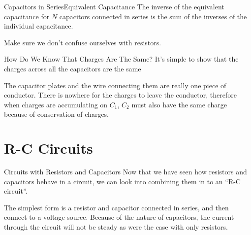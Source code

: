 \documentclass[12pt,aspectratio=169]{beamer}
\newcommand{\eq}[2]{\vspace{#1}{\Large\begin{displaymath}#2\end{displaymath}}}
\begin{document}
\begin{frame}{Capacitors in Series}{Equivalent Capacitance}
  The inverse of the equivalent capacitance for $N$ capacitors connected in
  series is the sum of the inverses of the individual capacitance.

  \eq{-.2in}{
    \boxed{ \frac1{C_s}=\sum_i\frac1{C_i} }
  }
  
  Make sure we don't confuse ourselves with resistors.
\end{frame}



\begin{frame}{How Do We Know That Charges Are The Same?}
  It's simple to show that the charges across all the capacitors are the same
  \begin{center}
  \end{center}
  The capacitor plates and the wire connecting them are really one piece of
  conductor. There is nowhere for the charges to leave the conductor, therefore
  when charges are accumulating on $C_1$, $C_2$ must also have the same charge
  because of conservation of charges.
\end{frame}



\section{R-C Circuits}

\begin{frame}{Circuits with Resistors and Capacitors}
  Now that we have seen how resistors and capacitors behave in a circuit, we
  can look into combining them in to an ``R-C circuit''.
  \begin{center}
  \end{center}
  The simplest form is a resistor and capacitor connected in series, and
  then connect to a voltage source. Because of the nature of capacitors, the
  current through the circuit will not be steady as were the case with only
  resistors.
\end{frame}
\end{document}
